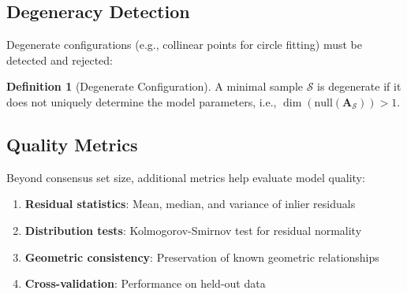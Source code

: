\documentclass[12pt]{article}
\renewcommand{\vec}[1]{\mathbf{#1}}
\theoremstyle{definition}
\newtheorem{definition}{Definition}[section]
\begin{document}
\subsection{Degeneracy Detection}

Degenerate configurations (e.g., collinear points for circle fitting) must be detected and rejected:

\begin{definition}[Degenerate Configuration]
    A minimal sample $\mathcal{S}$ is degenerate if it does not uniquely determine the model parameters, i.e., $\dim(\text{null}(\vec{A}_\mathcal{S})) > 1$.
\end{definition}

\subsection{Quality Metrics}

Beyond consensus set size, additional metrics help evaluate model quality:

\begin{enumerate}
    \item \textbf{Residual statistics}: Mean, median, and variance of inlier residuals
    \item \textbf{Distribution tests}: Kolmogorov-Smirnov test for residual normality
    \item \textbf{Geometric consistency}: Preservation of known geometric relationships
    \item \textbf{Cross-validation}: Performance on held-out data
\end{enumerate}
\end{document}
